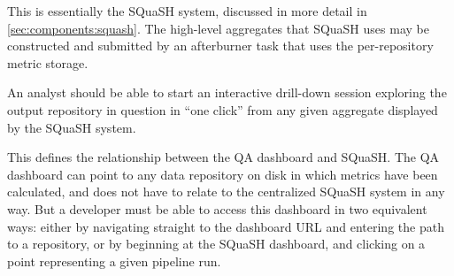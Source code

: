 This is essentially the SQuaSH system, discussed in more detail in \ref{sec:components:squash}.
The high-level aggregates that SQuaSH uses may be constructed and submitted by an afterburner task that uses the per-repository metric storage.

\begin{recommendation}
An analyst should be able to start an interactive drill-down session exploring the output repository in question in ``one click'' from any given aggregate displayed by the SQuaSH system.
\end{recommendation}

This defines the relationship between the QA dashboard and SQuaSH.
The QA dashboard can point to any data repository on disk in which metrics have been calculated, and does not have to relate to the centralized SQuaSH system in any way.
But a developer must be able to access this dashboard in two equivalent ways: either by navigating straight to the dashboard URL and entering the path to a repository, or by beginning at the SQuaSH dashboard, and clicking on a point representing a given pipeline run.
